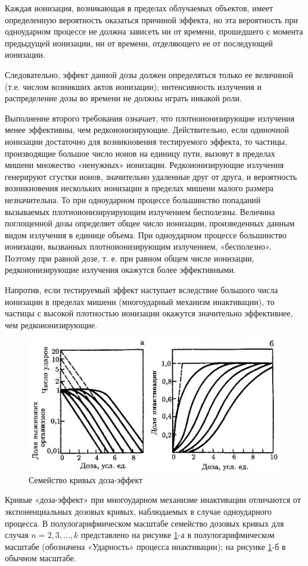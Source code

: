\documentclass[a4paper, 14pt]{article}
\begin{document}
Каждая ионизация, возникающая в пределах облучаемых объектов, имеет
определенную вероятность оказаться причиной эффекта, но эта вероятность при
одноударном процессе не должна зависеть ни от времени, прошедшего с момента
предыдущей ионизации, ни от времени, отделяющего ее от последующей ионизации.

Следовательно, эффект данной дозы должен определяться только ее величиной
(т.е. числом возникших актов ионизации); интенсивность излучения и распределение
дозы во времени не должны играть никакой роли.

Выполнение второго требования означает, что плотноионизирующие излучения
менее эффективны, чем редкоионизирующие. Действительно, если одиночной
ионизации достаточно для возникновения тестируемого эффекта, то частицы,
производящие большое число ионов на единицу пути, вызовут в пределах мишени
множество «ненужных» ионизации. Редкоионизирующие излучения генерируют
сгустки ионов, значительно удаленные друг от друга, и вероятность возникновения
нескольких ионизации в пределах мишени малого размера незначительна. То при
одноударном процессе большинство попаданий вызываемых
плотноионизируирующим излучением бесполезны. Величина поглощенной дозы
определяет общее число ионизации, произведенных данным видом излучения в
единице объема. При одноударном процессе большинство ионизации, вызванных
плотноионизирующим излучением, «бесполезно». Поэтому при равной дозе, т. е. при
равном общем числе ионизации, редкоионизирующие излучения окажутся более
эффективными.

Напротив, если тестируемый эффект наступает вследствие большого числа ионизации в пределах мишени (многоударный механизм инактивации), то частицы с высокой плотностью ионизации окажутся значительно эффективнее, чем редкоионизирующие.

\begin{figure}[htbp]
    \centering
    \includegraphics[width=\textwidth]{DozeCurveFamily.png}
    \caption{Семейство кривых доза-эффект}
    \label{DozeCurveFamily}
\end{figure}
Кривые «доза-эффект» при многоударном механизме инактивации отличаются
от экспоненциальных дозовых кривых, наблюдаемых в случае одноударного процесса.
В полулогарифмическом масштабе семейство дозовых кривых для случая $n =2, 3, ..., k$
представлено на рисунке \ref{DozeCurveFamily}-а в полулогарифмическом масштабе (обозначена
«Ударность» процесса инактивации); на рисунке \ref{DozeCurveFamily}-б в обычном масштабе.
\end{document}
